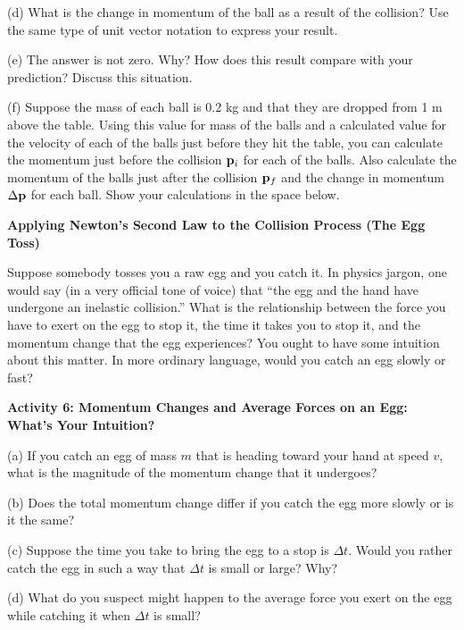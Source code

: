 (d) What is the change in momentum of the ball as a result of the collision?
Use the same type of unit vector notation to express your result. 
\vspace{10mm}

(e) The answer is not zero. Why? How does this result compare with your prediction?
Discuss this situation.
\vspace{20mm}

(f) Suppose the mass of each ball is 0.2 kg and that they are dropped from 1
m above the table. Using this value for mass of the balls and a calculated value
for the velocity of each of the balls just before they hit the table, you can
calculate the momentum just before the collision \( {{\bf p}_{i}} \)
for each of the balls. Also calculate the momentum of the balls just after the
collision \( {{\bf p}_{f}} \) and the change in momentum \( \Delta {\bf p} \)
for each ball. Show your calculations in the space below.
\vspace{30mm}

\textbf{Applying Newton's Second Law to the Collision Process (The Egg Toss)}

Suppose somebody tosses you a raw egg and you catch it. In physics jargon, one
would say (in a very official tone of voice) that ``the egg and the
hand have undergone an inelastic collision.'' What is the relationship
between the force you have to exert on the egg to stop it, the time it takes
you to stop it, and the momentum change that the egg experiences? You ought
to have some intuition about this matter. In more ordinary language, would you
catch an egg slowly or fast?

\textbf{Activity 6: Momentum Changes and Average Forces on an Egg: What's Your
Intuition?} 

(a) If you catch an egg of mass $m$ that is heading toward your hand at speed
$v$, what is the magnitude of the momentum change that it undergoes?
\vspace{10mm}

(b) Does the total momentum change differ if you catch the egg more slowly or
is it the same?
\vspace{10mm}

(c) Suppose the time you take to bring the egg to a stop is \( \Delta  t\).
Would you rather catch the egg in such a way that \( \Delta  t\) is small or
large? Why?
\vspace{20mm}

(d) What do you suspect might happen to the average force you exert on the egg
while catching it when \( \Delta t \) is small?
\vspace{20mm}

